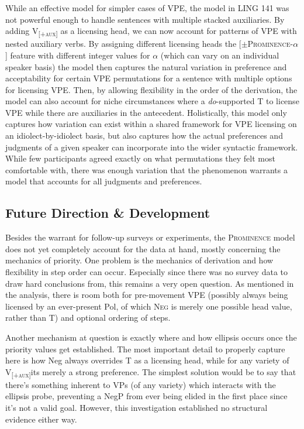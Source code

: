 \documentclass[11pt, oneside]{article}
\begin{document}
While an effective model for simpler cases of VPE, the model in LING 141 was not powerful enough to handle sentences with multiple stacked auxiliaries. By adding V\textsubscript{\textsc{[+aux]}} as a licensing head, we can now account for patterns of VPE with nested auxiliary verbs. By assigning different licensing heads the [$\pm$\textsc{Prominence-}$\alpha$] feature with different integer values for $\alpha$ (which can vary on an individual speaker basis) the model then captures the natural variation in preference and acceptability for certain VPE permutations for a sentence with multiple options for licensing VPE. Then, by allowing flexibility in the order of the derivation, the model can also account for niche circumstances where a \textit{do}-supported T to license VPE while there are auxiliaries in the antecedent. Holistically, this model only captures how variation can exist within a shared framework for VPE licensing on an idiolect-by-idiolect basis, but also captures how the actual preferences and judgments of a given speaker can incorporate into the wider syntactic framework. While few participants agreed exactly on what permutations they felt most comfortable with, there was enough variation that the phenomenon warrants a model that accounts for all judgments and preferences.\pagebreak 

\subsection{Future Direction \& Development}

Besides the warrant for follow-up surveys or experiments, the \textsc{Prominence} model does not yet completely account for the data at hand, mostly concerning the mechanics of priority. One problem is the mechanics of derivation and how flexibility in step order can occur. Especially since there was no survey data to draw hard conclusions from, this remains a very open question. As mentioned in the analysis, there is room both for pre-movement VPE (possibly always being licensed by an ever-present Pol, of which \textsc{Neg} is merely one possible head value, rather than T) and optional ordering of steps. 

Another mechanism at question is exactly where and how ellipsis occurs once the priority values get established. The most important detail to properly capture here is how Neg always overrides T as a licensing head, while for any variety of V\textsubscript{\textsc{[+aux]}}its merely a strong preference. The simplest solution would be to say that there's something inherent to VPs (of any variety) which interacts with the ellipsis probe, preventing a NegP from ever being elided in the first place since it's not a valid goal. However, this investigation established no structural evidence either way.
\end{document}
